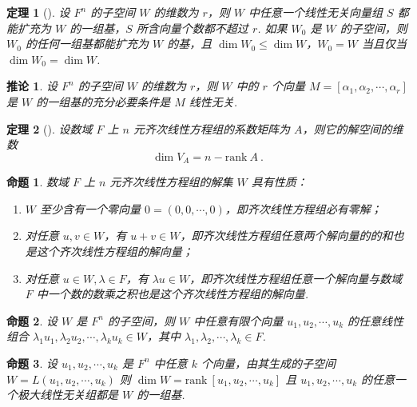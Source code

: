 \documentclass[zihao=-4,UTF8,linespread=1.8,nothm]{aytony_base}
\newtheorem{theorem}{\indent 定理}[subsection]
\newtheorem{proposition}{\indent 命题}[subsection]
\newtheorem*{corollary}{\indent 推论}
\begin{document}
\begin{theorem}[]
    设 $F^n$ 的子空间 $W$ 的维数为 $r$，则 $W$ 中任意一个线性无关向量组 $S$ 都能扩充为 $W$ 的一组基，$S$ 所含向量个数都不超过 $r$. 如果 $W_0$ 是 $W$ 的子空间，则 $W_0$ 的任何一组基都能扩充为 $W$ 的基，且 $\dim W_0 \leqslant \dim W$，$W_0 = W$ 当且仅当 $\dim W_0 = \dim W$.
\end{theorem}

\begin{corollary}
    设 $F^n$ 的子空间 $W$ 的维数为 $r$，则 $W$ 中的 $r$ 个向量 $M = [\alpha_1, \alpha_2, \cdots, \alpha_r]$ 是 $W$ 的一组基的充分必要条件是 $M$ 线性无关.
\end{corollary}

\begin{theorem}[]
    设数域 $F$ 上 $n$ 元齐次线性方程组的系数矩阵为 $A$，则它的解空间的维数 $$
        \dim V_A = n - \mathrm{rank}\ A\ .
    $$
\end{theorem}

\begin{proposition}
    数域 $F$ 上 $n$ 元齐次线性方程组的解集 $W$ 具有性质：
    \begin{enumerate}[nosep]
        \item $W$ 至少含有一个零向量 $0 = (0, 0, \cdots, 0)$，即齐次线性方程组必有零解；
        \item 对任意 $u, v \in W$，有 $u+v\in W$，即齐次线性方程组任意两个解向量的的和也是这个齐次线性方程组的解向量；
        \item 对任意 $u\in W, \lambda \in F$，有 $\lambda u \in W$，即齐次线性方程组任意一个解向量与数域 $F$ 中一个数的数乘之积也是这个齐次线性方程组的解向量.
    \end{enumerate}
\end{proposition}

\begin{proposition}
    设 $W$ 是 $F^n$ 的子空间，则 $W$ 中任意有限个向量 $u_1, u_2, \cdots, u_k$ 的任意线性组合 $\lambda_1 u_1, \lambda_2 u_2, \cdots, \lambda_k u_k \in W$，其中 $\lambda_1, \lambda_2, \cdots, \lambda_k \in F$.
\end{proposition}

\begin{proposition}
    设 $u_1, u_2, \cdots, u_k$ 是 $F^n$ 中任意 $k$ 个向量，由其生成的子空间 $W = L(u_1, u_2,\!\cdots,\!u_k)$ 则 $\dim W = \mathrm{rank}\ [u_1, u_2, \cdots, u_k]$ 且 $u_1, u_2, \cdots, u_k$ 的任意一个极大线性无关组都是 $W$ 的一组基.
\end{proposition}
\end{document}
